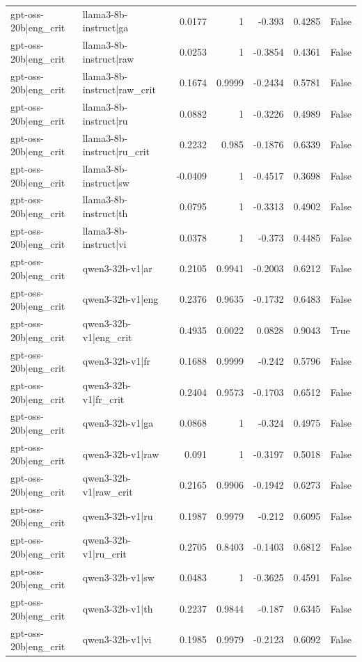 \begin{table}
\begin{tabular}{l l r r r r l}
gpt-oss-20b|eng_crit & llama3-8b-instruct|ga & 0.0177 & 1 & -0.393 & 0.4285 & False \\
gpt-oss-20b|eng_crit & llama3-8b-instruct|raw & 0.0253 & 1 & -0.3854 & 0.4361 & False \\
gpt-oss-20b|eng_crit & llama3-8b-instruct|raw_crit & 0.1674 & 0.9999 & -0.2434 & 0.5781 & False \\
gpt-oss-20b|eng_crit & llama3-8b-instruct|ru & 0.0882 & 1 & -0.3226 & 0.4989 & False \\
gpt-oss-20b|eng_crit & llama3-8b-instruct|ru_crit & 0.2232 & 0.985 & -0.1876 & 0.6339 & False \\
gpt-oss-20b|eng_crit & llama3-8b-instruct|sw & -0.0409 & 1 & -0.4517 & 0.3698 & False \\
gpt-oss-20b|eng_crit & llama3-8b-instruct|th & 0.0795 & 1 & -0.3313 & 0.4902 & False \\
gpt-oss-20b|eng_crit & llama3-8b-instruct|vi & 0.0378 & 1 & -0.373 & 0.4485 & False \\
gpt-oss-20b|eng_crit & qwen3-32b-v1|ar & 0.2105 & 0.9941 & -0.2003 & 0.6212 & False \\
gpt-oss-20b|eng_crit & qwen3-32b-v1|eng & 0.2376 & 0.9635 & -0.1732 & 0.6483 & False \\
gpt-oss-20b|eng_crit & qwen3-32b-v1|eng_crit & 0.4935 & 0.0022 & 0.0828 & 0.9043 & True \\
gpt-oss-20b|eng_crit & qwen3-32b-v1|fr & 0.1688 & 0.9999 & -0.242 & 0.5796 & False \\
gpt-oss-20b|eng_crit & qwen3-32b-v1|fr_crit & 0.2404 & 0.9573 & -0.1703 & 0.6512 & False \\
gpt-oss-20b|eng_crit & qwen3-32b-v1|ga & 0.0868 & 1 & -0.324 & 0.4975 & False \\
gpt-oss-20b|eng_crit & qwen3-32b-v1|raw & 0.091 & 1 & -0.3197 & 0.5018 & False \\
gpt-oss-20b|eng_crit & qwen3-32b-v1|raw_crit & 0.2165 & 0.9906 & -0.1942 & 0.6273 & False \\
gpt-oss-20b|eng_crit & qwen3-32b-v1|ru & 0.1987 & 0.9979 & -0.212 & 0.6095 & False \\
gpt-oss-20b|eng_crit & qwen3-32b-v1|ru_crit & 0.2705 & 0.8403 & -0.1403 & 0.6812 & False \\
gpt-oss-20b|eng_crit & qwen3-32b-v1|sw & 0.0483 & 1 & -0.3625 & 0.4591 & False \\
gpt-oss-20b|eng_crit & qwen3-32b-v1|th & 0.2237 & 0.9844 & -0.187 & 0.6345 & False \\
gpt-oss-20b|eng_crit & qwen3-32b-v1|vi & 0.1985 & 0.9979 & -0.2123 & 0.6092 & False \\

\end{tabular}
\end{table}
